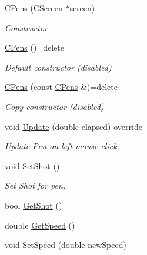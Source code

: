 \begin{DoxyCompactItemize}
\item 
\mbox{\hyperlink{class_c_pens_af7d7b1e969d038c385998bca870cb854}{C\+Pens}} (\mbox{\hyperlink{class_c_screen}{C\+Screen}} $\ast$screen)
\begin{DoxyCompactList}\small\item\em Constructor. \end{DoxyCompactList}\item 
\mbox{\label{class_c_pens_ade69966f5065e19f4e0704309c7cf9d1}} 
\mbox{\hyperlink{class_c_pens_ade69966f5065e19f4e0704309c7cf9d1}{C\+Pens}} ()=delete
\begin{DoxyCompactList}\small\item\em Default constructor (disabled) \end{DoxyCompactList}\item 
\mbox{\label{class_c_pens_aa87dce9713b4a71cc3977658ff0dc88d}} 
\mbox{\hyperlink{class_c_pens_aa87dce9713b4a71cc3977658ff0dc88d}{C\+Pens}} (const \mbox{\hyperlink{class_c_pens}{C\+Pens}} \&)=delete
\begin{DoxyCompactList}\small\item\em Copy constructor (disabled) \end{DoxyCompactList}\item 
void \mbox{\hyperlink{class_c_pens_ae4a11a23cb7a91edc9b222f4b8a2f20f}{Update}} (double elapsed) override
\begin{DoxyCompactList}\small\item\em Update Pen on left mouse click. \end{DoxyCompactList}\item 
\mbox{\label{class_c_pens_a617b365e7e00743aff41f355331ff738}} 
void \mbox{\hyperlink{class_c_pens_a617b365e7e00743aff41f355331ff738}{Set\+Shot}} ()
\begin{DoxyCompactList}\small\item\em Set Shot for pen. \end{DoxyCompactList}\item 
bool \mbox{\hyperlink{class_c_pens_af87130ba45662455044dcc15547e9a57}{Get\+Shot}} ()
\item 
double \mbox{\hyperlink{class_c_pens_a94df476295def576bc8274d2f0b25e87}{Get\+Speed}} ()
\item 
void \mbox{\hyperlink{class_c_pens_a5864267ee35a4787de85bc721732f819}{Set\+Speed}} (double new\+Speed)

\end{DoxyCompactItemize}
